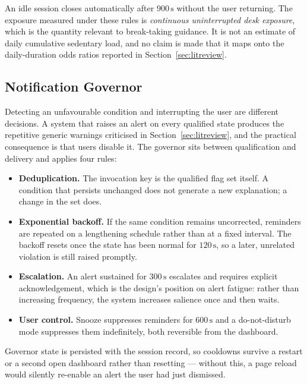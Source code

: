 An idle session closes automatically after $900\,\text{s}$ without the user returning. The exposure
measured under these rules is \emph{continuous uninterrupted desk exposure}, which is the quantity
relevant to break-taking guidance. It is not an estimate of daily cumulative sedentary load, and no
claim is made that it maps onto the daily-duration odds ratios reported in Section~\ref{sec:litreview}.

\subsection{Notification Governor}
\label{subsec:governor}

Detecting an unfavourable condition and interrupting the user are different decisions. A system
that raises an alert on every qualified state produces the repetitive generic warnings criticised
in Section~\ref{sec:litreview}, and the practical consequence is that users disable it. The
governor sits between qualification and delivery and applies four rules:

\begin{itemize}
    \item \textbf{Deduplication.} The invocation key is the qualified flag set itself. A condition
    that persists unchanged does not generate a new explanation; a change in the set does.
    \item \textbf{Exponential backoff.} If the same condition remains uncorrected, reminders are
    repeated on a lengthening schedule rather than at a fixed interval. The backoff resets once the
    state has been normal for $120\,\text{s}$, so a later, unrelated violation is still raised
    promptly.
    \item \textbf{Escalation.} An alert sustained for $300\,\text{s}$ escalates and requires
    explicit acknowledgement, which is the design's position on alert fatigue: rather than
    increasing frequency, the system increases salience once and then waits.
    \item \textbf{User control.} Snooze suppresses reminders for $600\,\text{s}$ and a
    do-not-disturb mode suppresses them indefinitely, both reversible from the dashboard.
\end{itemize}

Governor state is persisted with the session record, so cooldowns survive a restart or a second
open dashboard rather than resetting --- without this, a page reload would silently re-enable an
alert the user had just dismissed.

